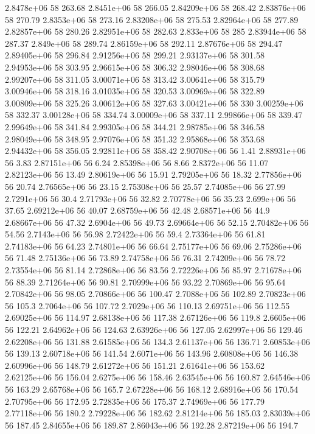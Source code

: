 2.8478e+06 58 263.68
2.8451e+06 58 266.05
2.84209e+06 58 268.42
2.83876e+06 58 270.79
2.8353e+06 58 273.16
2.83208e+06 58 275.53
2.82964e+06 58 277.89
2.82857e+06 58 280.26
2.82951e+06 58 282.63
2.833e+06 58 285
2.83944e+06 58 287.37
2.849e+06 58 289.74
2.86159e+06 58 292.11
2.87676e+06 58 294.47
2.89405e+06 58 296.84
2.91256e+06 58 299.21
2.93137e+06 58 301.58
2.94953e+06 58 303.95
2.96615e+06 58 306.32
2.98046e+06 58 308.68
2.99207e+06 58 311.05
3.00071e+06 58 313.42
3.00641e+06 58 315.79
3.00946e+06 58 318.16
3.01035e+06 58 320.53
3.00969e+06 58 322.89
3.00809e+06 58 325.26
3.00612e+06 58 327.63
3.00421e+06 58 330
3.00259e+06 58 332.37
3.00128e+06 58 334.74
3.00009e+06 58 337.11
2.99866e+06 58 339.47
2.99649e+06 58 341.84
2.99305e+06 58 344.21
2.98785e+06 58 346.58
2.98049e+06 58 348.95
2.97076e+06 58 351.32
2.95868e+06 58 353.68
2.94432e+06 58 356.05
2.92811e+06 58 358.42
2.90708e+06 56 1.41
2.88931e+06 56 3.83
2.87151e+06 56 6.24
2.85398e+06 56 8.66
2.8372e+06 56 11.07
2.82123e+06 56 13.49
2.80619e+06 56 15.91
2.79205e+06 56 18.32
2.77856e+06 56 20.74
2.76565e+06 56 23.15
2.75308e+06 56 25.57
2.74085e+06 56 27.99
2.7291e+06 56 30.4
2.71793e+06 56 32.82
2.70778e+06 56 35.23
2.699e+06 56 37.65
2.69212e+06 56 40.07
2.68759e+06 56 42.48
2.68571e+06 56 44.9
2.68667e+06 56 47.32
2.6904e+06 56 49.73
2.69664e+06 56 52.15
2.70482e+06 56 54.56
2.7143e+06 56 56.98
2.72422e+06 56 59.4
2.73364e+06 56 61.81
2.74183e+06 56 64.23
2.74801e+06 56 66.64
2.75177e+06 56 69.06
2.75286e+06 56 71.48
2.75136e+06 56 73.89
2.74758e+06 56 76.31
2.74209e+06 56 78.72
2.73554e+06 56 81.14
2.72868e+06 56 83.56
2.72226e+06 56 85.97
2.71678e+06 56 88.39
2.71264e+06 56 90.81
2.70999e+06 56 93.22
2.70869e+06 56 95.64
2.70842e+06 56 98.05
2.70866e+06 56 100.47
2.7088e+06 56 102.89
2.70823e+06 56 105.3
2.7064e+06 56 107.72
2.7029e+06 56 110.13
2.69751e+06 56 112.55
2.69025e+06 56 114.97
2.68138e+06 56 117.38
2.67126e+06 56 119.8
2.6605e+06 56 122.21
2.64962e+06 56 124.63
2.63926e+06 56 127.05
2.62997e+06 56 129.46
2.62208e+06 56 131.88
2.61585e+06 56 134.3
2.61137e+06 56 136.71
2.60853e+06 56 139.13
2.60718e+06 56 141.54
2.6071e+06 56 143.96
2.60808e+06 56 146.38
2.60996e+06 56 148.79
2.61272e+06 56 151.21
2.61641e+06 56 153.62
2.62125e+06 56 156.04
2.6275e+06 56 158.46
2.63545e+06 56 160.87
2.64546e+06 56 163.29
2.65768e+06 56 165.7
2.67228e+06 56 168.12
2.68916e+06 56 170.54
2.70795e+06 56 172.95
2.72835e+06 56 175.37
2.74969e+06 56 177.79
2.77118e+06 56 180.2
2.79228e+06 56 182.62
2.81214e+06 56 185.03
2.83039e+06 56 187.45
2.84655e+06 56 189.87
2.86043e+06 56 192.28
2.87219e+06 56 194.7
